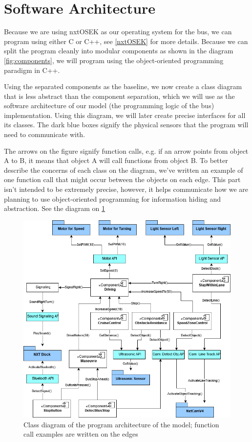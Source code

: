 
\section{Software Architecture}
Because we are using nxtOSEK as our operating system for the bus, we can program using either C or C++, see \ref{nxtOSEK} for more details. Because we can split the program cleanly into modular components as shown in the diagram \ref{fig:components}, we will program using the object-oriented programming paradigm in C++. 

Using the separated components as the baseline, we now create a class diagram that is less abstract than the component separation, which we will use as the software architecture of our model (the programming logic of the bus) implementation. Using this diagram, we will later create precise interfaces for all its classes. The dark blue boxes signify the physical sensors that the program will need to communicate with. 

The arrows on the figure signify function calls, e.g. if an arrow points from object A to B, it means that object A will call functions from object B. To better describe the concerns of each class on the diagram, we've written an example of one function call that might occur between the objects on each edge. This part isn't intended to be extremely precise, however, it helps communicate how we are planning to use object-oriented programming for information hiding and abstraction. See the diagram on \ref{fig:softwareArchitecture}

\begin{figure}[ht]
    \includegraphics[width=\textwidth]{Images/Design/architectureClassDiagram.png}
    \caption{Class diagram of the program architecture of the model; function call examples are written on the edges}
    \label{fig:softwareArchitecture}
\end{figure}

